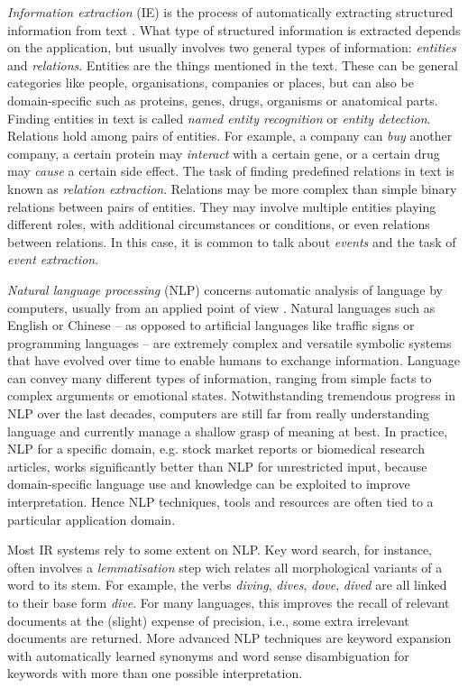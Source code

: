 \emph{Information extraction} (IE) is the process of automatically extracting structured information from text \citep{Jiang2012Information}.
What type of structured information is extracted depends on the application, but usually involves two general types of information: \emph{entities} and \emph{relations}.
Entities are the things mentioned in the text.
These can be general categories like people, organisations, companies or places, but can also be domain-specific such as proteins, genes, drugs, organisms or anatomical parts.
Finding entities in text is called \emph{named entity recognition} or \emph{entity detection}.
Relations hold among pairs of entities.
For example, a company can \emph{buy} another company, a certain protein may \emph{interact} with a certain gene, or a certain drug may \emph{cause} a certain side effect.
The task of finding predefined relations in text is known as \emph{relation extraction}.  
Relations may be more complex than simple binary relations between pairs of entities.
They may involve multiple entities playing different roles, with additional circumstances or conditions, or even relations between relations.
In this case, it is common to talk about \emph{events} and the task of \emph{event extraction}.

\emph{Natural language processing} (NLP) concerns automatic analysis of language by computers, usually from an applied point of view  \citep{jurafsky2000speech,manning1999foundations}.
Natural languages such as English or Chinese -- as opposed to artificial languages like traffic signs or programming languages -- are extremely complex and versatile symbolic systems that have evolved over time to enable humans to exchange information.
Language can convey many different types of information, ranging from simple facts to complex arguments or emotional states.
Notwithstanding tremendous progress in NLP over the last decades, computers are still far from really understanding language and currently manage a shallow grasp of meaning at best.
In practice, NLP for a specific domain, e.g. stock market reports or biomedical research articles, works significantly better than NLP for unrestricted input, because domain-specific language use and knowledge can be exploited to improve interpretation. 
Hence NLP techniques, tools and resources are often tied to a particular application domain.

Most IR systems rely to some extent on NLP.
Key word search, for instance, often involves a \emph{lemmatisation} step wich relates all morphological variants of a word to its stem.
For example, the verbs \emph{diving}, \emph{dives}, \emph{dove}, \emph{dived} are all linked to their base form \emph{dive}.
For many languages, this improves the recall of relevant documents at the (slight) expense of precision, i.e., some extra irrelevant documents are returned.
More advanced NLP techniques are keyword expansion with automatically learned synonyms and word sense disambiguation for keywords with more than one possible interpretation.  


